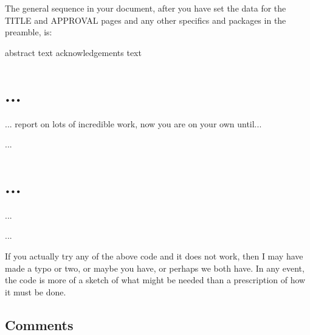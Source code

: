    The general sequence in your document, after you have set the data for
the TITLE and APPROVAL pages and any other specifics and packages in the 
preamble, is:
\begin{lcode}
   \makepagenote

\frontmatter
\thetitlepage
\approvalpage
\asuabstract 
   abstract text
  \asuacknowledgements
    acknowledgements text
\tableofcontents
\mainmatter
\pagestyle{asu}
\chapter{...} %
... report on lots of incredible work, now you are on your
own until...

   \printpagenotes
   \begin{thebibliography}...\end{thebibliography}
  \appendix
  \chapter{...}
  ...
   \begin{biosketch} ... \end{biosketch}


\end{lcode}

    If you actually try any of the above code and it does not work, then
I may have made a typo or two, or maybe you have, or perhaps we both have.
In any event, the code is more of a sketch of what might be needed than
a prescription of how it must be done.

\section{Comments}

